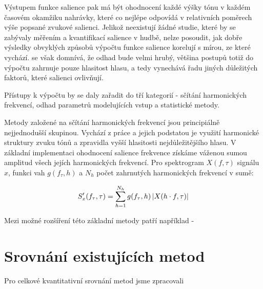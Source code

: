 Výstupem funkce salience pak má být ohodnocení každé výšky tónu v každém časovém okamžiku nahrávky, které co nejlépe odpovídá v relativních poměrech výše popsané zvukové salienci. Jelikož neexistují žádné studie, které by se zabývaly měřením a kvantifikací salience v hudbě, nelze posoudit, jak dobře výsledky obvyklých způsobů výpočtu funkce salience korelují s mírou, ze které vychází. \cite{Bittner2018a} se však domnívá, že odhad bude velmi hrubý, většina postupů totiž do výpočtu zahrnuje pouze hlasitost hlasu, a tedy vynechává řadu jiných důležitých faktorů, které salienci ovlivňují.

Přístupy k výpočtu by se daly zařadit do tří kategorií - sčítání harmonických frekvencí, odhad parametrů modelujících vstup a statistické metody. 

Metody založené na sčítání harmonických frekvencí jsou principiálně nejjednodušší skupinou. Vychází z práce \cite{Hermes1988} a jejich podstatou je využití harmonické struktury zvuku tónů a zpravidla vyšší hlasitosti nejdůležitějšího hlasu. V základní implementaci ohodnocení salience frekvence získáme váženou sumou amplitud všech jejích harmonických frekvencí. Pro spektrogram $X(f, \tau)$ signálu $x$, funkci vah $g(f_\tau, h)$ a $N_h$ počet zahrnutých harmonických frekvencí v sumě:

    $$S'_x(f_\tau, \tau) = \sum_{h=1}^{N_h}{g(f_\tau, h)\left|{X(h \cdot f, \tau)}\right|}$$

Mezi možné rozšíření této základní metody patří například 
    - 

\section{Srovnání existujících metod}

Pro celkové kvantitativní srovnání metod jsme zpracovali 




